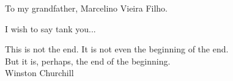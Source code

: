 \begin{dedicatoria}
  To my grandfather, Marcelino Vieira Filho.
\end{dedicatoria}

\begin{agradecimentos}
    I wish to say tank you...
\end{agradecimentos}

\begin{epigrafe}
  This is not the end. It is not even the beginning of the end.\\But it is, perhaps, the end of the beginning.\\Winston Churchill
\end{epigrafe}